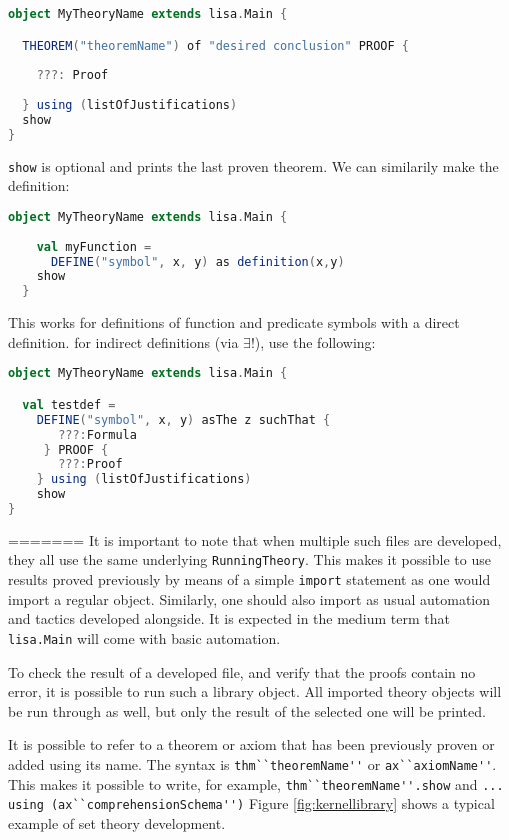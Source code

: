 \begin{lstlisting}[language=Scala, frame=single]
object MyTheoryName extends lisa.Main {

  THEOREM("theoremName") of "desired conclusion" PROOF {
    
    ???: Proof
    
  } using (listOfJustifications)
  show
}
\end{lstlisting}
\lstinline{show}{} is optional and prints the last proven theorem. We can similarily make the definition:

\noindent
\begin{minipage}{\textwidth}
  \begin{lstlisting}[language=Scala, frame=single]
  object MyTheoryName extends lisa.Main {
  
    val myFunction = 
      DEFINE("symbol", x, y) as definition(x,y)
    show
  }
  \end{lstlisting}
\end{minipage}
%
This works for definitions of function and predicate symbols with a direct definition. for indirect definitions (via $\exists !$), use the following:
%
\begin{lstlisting}[language=Scala, frame=single]
object MyTheoryName extends lisa.Main {

  val testdef =
    DEFINE("symbol", x, y) asThe z suchThat {
       ???:Formula
     } PROOF {
       ???:Proof
    } using (listOfJustifications)
    show
}
\end{lstlisting}


=======
It is important to note that when multiple such files are developed, they all use the same underlying \lstinline{RunningTheory}{}. This makes it possible to use results proved previously by means of a simple \lstinline{import}{} statement as one would import a regular object. Similarly, one should also import as usual automation and tactics developed alongside. It is expected in the medium term that \lstinline{lisa.Main}{} will come with basic automation.

To check the result of a developed file, and verify that the proofs contain no error, it is possible to run such a library object. 
All imported theory objects will be run through as well, but only the result of the selected one will be printed. 

It is possible to refer to a theorem or axiom that has been previously proven or added using its name. The syntax is \lstinline{thm``theoremName''}{} or \lstinline{ax``axiomName''}{}. This makes it possible to write, for example, \lstinline{thm``theoremName''.show}{} and \lstinline{... using (ax``comprehensionSchema'')} Figure \ref{fig:kernellibrary} shows a typical example of set theory development.


